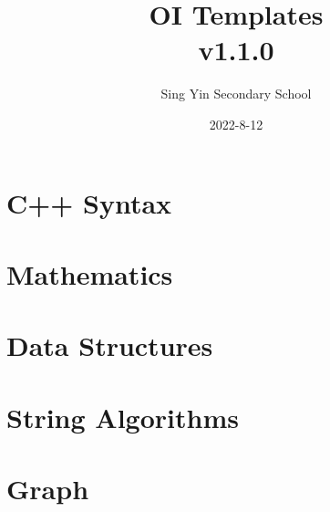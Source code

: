 \documentclass{article}
\title{%
    OI Templates \\
    \large v1.1.0}
\author{Sing Yin Secondary School}
\date{2022-8-12}
\begin{document}
\maketitle

\tableofcontents
\pagebreak

\section{C++ Syntax}




\pagebreak
\section{Mathematics}





\pagebreak
\section{Data Structures}






\pagebreak
\section{String Algorithms}



\pagebreak
\section{Graph}



\pagebreak
\end{document}
